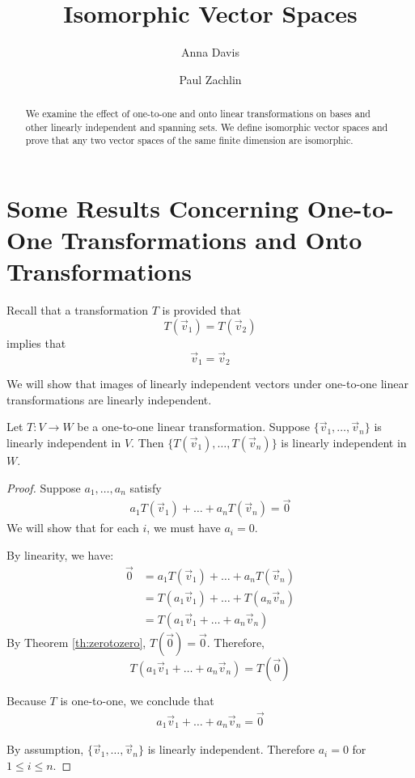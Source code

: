 \documentclass{ximera}
\author{Anna Davis \and Paul Zachlin} \title{Isomorphic Vector Spaces} \license{CC-BY 4.0}
\begin{document}
\begin{abstract}
  We examine the effect of one-to-one and onto linear transformations on bases and other linearly independent and spanning sets.  We define isomorphic vector spaces and prove that any two vector spaces of the same finite dimension are isomorphic.
\end{abstract}
\maketitle



\section*{Some Results Concerning One-to-One Transformations and Onto Transformations}

Recall that a transformation $T$ is  provided that $$T(\vec{v}_1)=T(\vec{v}_2)$$ implies that $$\vec{v}_1=\vec{v}_2$$

 We will show that images of linearly independent vectors under one-to-one linear transformations are linearly independent.  

\begin{theorem}\label{th:onetoonelinind} Let $T:V\rightarrow W$ be a one-to-one linear transformation.  Suppose $\{\vec{v}_1,\ldots,\vec{v}_n\}$ is linearly independent in $V$.  Then $\{T(\vec{v}_1),\ldots,T(\vec{v}_n)\}$ is linearly independent in $W$.
\end{theorem}

\begin{proof}
Suppose $a_1, \ldots, a_n$ satisfy
\begin{align}\label{onlysolution}a_1T(\vec{v}_1)+\ldots +a_nT(\vec{v}_n)=\vec{0}\end{align}
We will show that for each $i$, we must have $a_i=0$.

By linearity, we have:
\begin{align*}\vec{0}&=a_1T(\vec{v}_1)+\ldots +a_nT(\vec{v}_n)\\
&=T(a_1\vec{v}_1)+\ldots +T(a_n\vec{v}_n)\\
&=T(a_1\vec{v}_1+\ldots +a_n\vec{v}_n)
\end{align*}
By Theorem \ref{th:zerotozero}, $T(\vec{0})=\vec{0}$.  Therefore,
$$T(a_1\vec{v}_1+\ldots +a_n\vec{v}_n)=T(\vec{0})$$

Because $T$ is one-to-one, we conclude that 
\begin{align}\label{onlytrivial}a_1\vec{v}_1+\ldots +a_n\vec{v}_n=\vec{0}\end{align}


By assumption, $\{\vec{v}_1,\ldots,\vec{v}_n\}$ is linearly independent.  Therefore $a_i=0$ for $1\leq i\leq n$.  
\end{proof}
\end{document}
